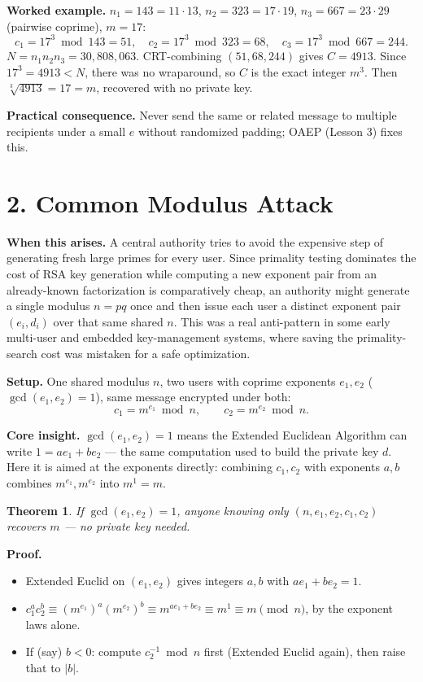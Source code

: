 \documentclass[11pt]{article}
\newtheorem{theorem}{Theorem}
\begin{document}
\textbf{Worked example.} $n_1=143=11{\cdot}13$, $n_2=323=17{\cdot}19$, $n_3=667=23{\cdot}29$ (pairwise coprime), $m=17$:
\[
c_1=17^3\bmod143=51,\quad c_2=17^3\bmod323=68,\quad c_3=17^3\bmod667=244.
\]
$N=n_1n_2n_3=30{,}808{,}063$. CRT-combining $(51,68,244)$ gives $C=4913$. Since $17^3=4913<N$, there was no wraparound, so $C$ is the exact integer $m^3$. Then $\sqrt[3]{4913}=17=m$, recovered with no private key.

\textbf{Practical consequence.} Never send the same or related message to multiple recipients under a small $e$ without randomized padding; OAEP (Lesson 3) fixes this.

\hrulefill

\section*{2. Common Modulus Attack}

\textbf{When this arises.} A central authority tries to avoid the expensive step of generating fresh large primes for every user. Since primality testing dominates the cost of RSA key generation while computing a new exponent pair from an already-known factorization is comparatively cheap, an authority might generate a single modulus $n=pq$ once and then issue each user a distinct exponent pair $(e_i,d_i)$ over that same shared $n$. This was a real anti-pattern in some early multi-user and embedded key-management systems, where saving the primality-search cost was mistaken for a safe optimization.

\textbf{Setup.} One shared modulus $n$, two users with coprime exponents $e_1,e_2$ ($\gcd(e_1,e_2)=1$), same message encrypted under both:
\[
c_1=m^{e_1}\bmod n,\qquad c_2=m^{e_2}\bmod n.
\]

\textbf{Core insight.} $\gcd(e_1,e_2)=1$ means the Extended Euclidean Algorithm can write $1=ae_1+be_2$ --- the same computation used to build the private key $d$. Here it is aimed at the exponents directly: combining $c_1,c_2$ with exponents $a,b$ combines $m^{e_1},m^{e_2}$ into $m^1=m$.

\begin{theorem}
If $\gcd(e_1,e_2)=1$, anyone knowing only $(n,e_1,e_2,c_1,c_2)$ recovers $m$ --- no private key needed.
\end{theorem}

\textbf{Proof.}
\begin{itemize}[nosep]
\item Extended Euclid on $(e_1,e_2)$ gives integers $a,b$ with $ae_1+be_2=1$.
\item $c_1^a c_2^b \equiv (m^{e_1})^a(m^{e_2})^b \equiv m^{ae_1+be_2} \equiv m^1 \equiv m \pmod n$, by the exponent laws alone.
\item If (say) $b<0$: compute $c_2^{-1}\bmod n$ first (Extended Euclid again), then raise that to $|b|$.
\end{itemize}
\end{document}
